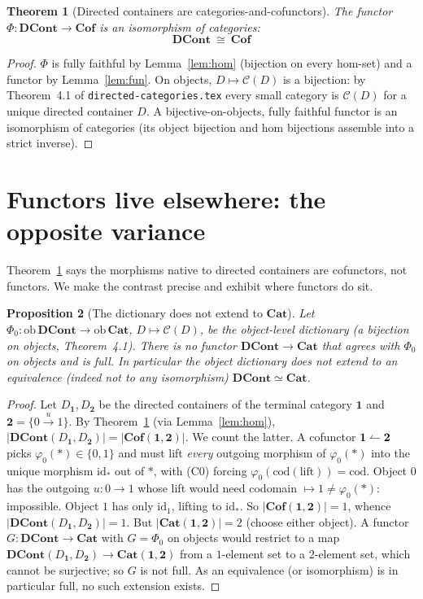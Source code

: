 \documentclass[11pt,a4paper]{article}
\newcommand{\Cat}{\mathbf{Cat}}
\newcommand{\Cof}{\mathbf{Cof}}
\newcommand{\DCont}{\mathbf{DCont}}
\newcommand{\id}{\mathrm{id}}
\newcommand{\cod}{\mathrm{cod}}
\newcommand{\ob}{\mathrm{ob}\,}
\newcommand{\co}{\mathrel{\text{\reflectbox{$\rightharpoonup$}}}}
\theoremstyle{definition}\newtheorem{definition}{Definition}[section]
\theoremstyle{plain}\newtheorem{proposition}[definition]{Proposition}
\newtheorem{theorem}[definition]{Theorem}
\theoremstyle{remark}\newtheorem{example}[definition]{Example}
\begin{document}
\begin{theorem}[Directed containers are categories-and-cofunctors]\label{thm:main}
The functor $\Phi\colon\DCont\to\Cof$ is an isomorphism of categories:
\[
  \boxed{\ \DCont\ \cong\ \Cof\ }
\]
\end{theorem}

\begin{proof}
$\Phi$ is fully faithful by Lemma~\ref{lem:hom} (bijection on every hom-set)
and a functor by Lemma~\ref{lem:fun}. On objects, $D\mapsto\mathcal C(D)$ is a
bijection: by Theorem~4.1 of \texttt{directed-categories.tex} every small
category is $\mathcal C(D)$ for a unique directed container $D$. A
bijective-on-objects, fully faithful functor is an isomorphism of categories
(its object bijection and hom bijections assemble into a strict inverse).
\end{proof}

\section{Functors live elsewhere: the opposite variance}

Theorem~\ref{thm:main} says the morphisms native to directed containers are
cofunctors, not functors. We make the contrast precise and exhibit where
functors do sit.

\begin{proposition}[The dictionary does not extend to $\Cat$]\label{prop:neq}
Let $\Phi_0\colon\ob\DCont\to\ob\Cat$, $D\mapsto\mathcal C(D)$, be the
object-level dictionary (a bijection on objects, Theorem~4.1). There is
\emph{no} functor $\DCont\to\Cat$ that agrees with $\Phi_0$ on objects and is
full. In particular the object dictionary does not extend to an equivalence
(indeed not to any isomorphism) $\DCont\simeq\Cat$.
\end{proposition}

\begin{proof}
Let $D_{\mathbf1}, D_{\mathbf2}$ be the directed containers of the terminal
category $\mathbf 1$ and $\mathbf 2=\{0\xrightarrow{u}1\}$. By
Theorem~\ref{thm:main} (via Lemma~\ref{lem:hom}),
$|\DCont(D_{\mathbf1},D_{\mathbf2})|=|\Cof(\mathbf1,\mathbf2)|$. We count the
latter. A cofunctor $\mathbf1\co\mathbf2$ picks $\varphi_0(\ast)\in\{0,1\}$ and
must lift \emph{every} outgoing morphism of $\varphi_0(\ast)$ into the unique
morphism $\id_\ast$ out of $\ast$, with (C0) forcing
$\varphi_0(\cod(\text{lift}))=\cod$. Object $0$ has the outgoing $u\colon0\to1$
whose lift would need codomain $\mapsto 1\neq\varphi_0(\ast)$: impossible.
Object $1$ has only $\id_1$, lifting to $\id_\ast$. So
$|\Cof(\mathbf1,\mathbf2)|=1$, whence $|\DCont(D_{\mathbf1},D_{\mathbf2})|=1$.
But $|\Cat(\mathbf1,\mathbf2)|=2$ (choose either object). A functor
$G\colon\DCont\to\Cat$ with $G=\Phi_0$ on objects would restrict to a map
$\DCont(D_{\mathbf1},D_{\mathbf2})\to\Cat(\mathbf1,\mathbf2)$ from a
$1$-element set to a $2$-element set, which cannot be surjective; so $G$ is
not full. As an equivalence (or isomorphism) is in particular full, no such
extension exists.
\end{proof}
\end{document}
